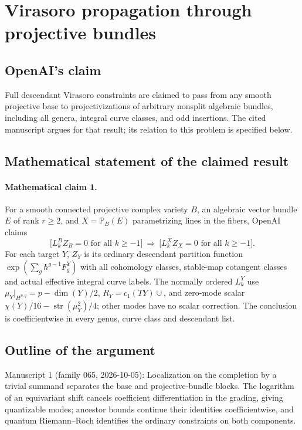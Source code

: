 \documentclass[11pt]{article}
\begin{document}
\section*{Virasoro propagation through projective bundles}

\subsection{OpenAI's claim}
Full descendant Virasoro constraints are claimed to pass from any smooth projective base to projectivizations of arbitrary nonsplit algebraic bundles, including all genera, integral curve classes, and odd insertions. The cited manuscript argues for that result; its relation to this problem is specified below.

\subsection{Mathematical statement of the claimed result}
\paragraph{Mathematical claim 1.} For a smooth connected projective complex variety $B$, an algebraic vector bundle $E$ of rank $r\ge2$, and $X=\mathbb P_B(E)$ parametrizing lines in the fibers, OpenAI claims
\[
\bigl[L_k^B Z_B=0\text{ for all }k\ge-1\bigr]\ \Longrightarrow\
\bigl[L_k^X Z_X=0\text{ for all }k\ge-1\bigr].
\]
For each target $Y$, $Z_Y$ is its ordinary descendant partition function $\exp(\sum_g\hbar^{g-1}F_g^Y)$ with all cohomology classes, stable-map cotangent classes and actual effective integral curve labels. The normally ordered $L_k^Y$ use $\mu_Y|_{H^{p,q}}=p-\dim(Y)/2$, $R_Y=c_1(TY)\cup$, and zero-mode scalar $\chi(Y)/16-\operatorname{str}(\mu_Y^2)/4$; other modes have no scalar correction. The conclusion is coefficientwise in every genus, curve class and descendant list.

\subsection{Outline of the argument}
Manuscript 1 (family 065, 2026-10-05): Localization on the completion by a trivial summand separates the base and projective-bundle blocks. The logarithm of an equivariant shift cancels coefficient differentiation in the grading, giving quantizable modes; ancestor bounds continue their identities coefficientwise, and quantum Riemann--Roch identifies the ordinary constraints on both components.
\end{document}
